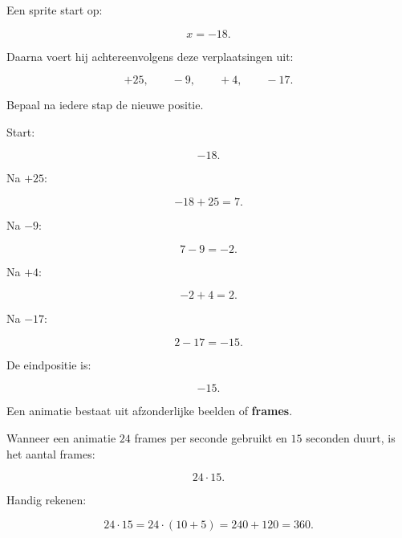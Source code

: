 \documentclass{ximera}
\begin{document}
\begin{oefening}{\oefU\ESS}

Een sprite start op:

\[
x=-18.
\]

Daarna voert hij achtereenvolgens deze verplaatsingen uit:

\[
+25,\qquad -9,\qquad +4,\qquad -17.
\]

\begin{question}

Bepaal na iedere stap de nieuwe positie.

\begin{oplossing}

Start:

\[
-18.
\]

Na \(+25\):

\[
-18+25=7.
\]

Na \(-9\):

\[
7-9=-2.
\]

Na \(+4\):

\[
-2+4=2.
\]

Na \(-17\):

\[
2-17=-15.
\]

De eindpositie is:

\[
\boxed{-15}.
\]

\end{oplossing}

\end{question}

\end{oefening}




Een animatie bestaat uit afzonderlijke beelden of \textbf{frames}.

Wanneer een animatie \(24\) frames per seconde gebruikt en \(15\) seconden
duurt, is het aantal frames:

\[
24\cdot15.
\]

Handig rekenen:

\[
24\cdot15
=
24\cdot(10+5)
=
240+120
=
360.
\]
\end{document}
